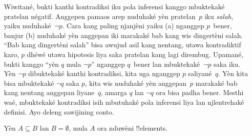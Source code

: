 \documentclass[../../../include/open-logic-section]{subfiles}
\begin{document}


Wiwitané, bukti kanthi kontradiksi iku pola inferensi kanggo
mbuktekaké pratelan négatif. Anggepen pamaos arep
nuduhaké yèn pratelan~$p$ iku \emph{salah}, yaiku
nuduhaké~$\lnot p$. Cara kang paling njanjèni yaiku
(a) nganggep $p$~bener, banjur (b) nuduhaké yèn anggepan
iki marakaké bab kang wis dingertèni salah.
``Bab kang dingertèni salah'' bisa awujud asil kang
nentang, utawa kontradiktif karo, $p$ dhéwé utawa
hipotesis liya saka pratelan kang lagi dirembug.
Upamané, bukti kanggo ``yèn $q$ mula $\lnot p$''
nganggep $q$~bener lan mbuktekaké~$\lnot p$ saka iku.
Yèn $\lnot p$ dibuktekaké kanthi kontradiksi, kita
uga nganggep $p$ saliyané~$q$. Yèn kita
bisa mbuktekaké $\lnot q$ saka $p$, kita wis nuduhaké yèn
anggepan~$p$ marakaké bab kang nentang anggepan
liyane~$q$, amarga $q$ lan $\lnot q$ ora bisa padha
bener. Mesthi waé, mbuktekaké kontradiksi isih
mbutuhaké pola inferensi liya lan njlentrehaké
definisi. Ayo deleng sawijining conto.

\begin{prop}
  Yèn $A \subseteq B$ lan $B = \emptyset$, mula $A$
  ora nduwèni !!{element}s.
\end{prop}
\end{document}
